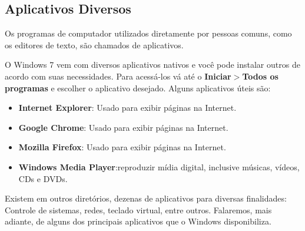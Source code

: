 \documentclass[hidelinks,12pt]{article}
\begin{document}
\subsection{Aplicativos Diversos}

Os programas de computador utilizados diretamente por pessoas comuns, como os editores de texto, são chamados de aplicativos.

O Windows 7 vem com diversos aplicativos nativos e você pode instalar outros de acordo com suas necessidades. Para acessá-los vá até o {\bf Iniciar$>$Todos os programas} e escolher o aplicativo desejado. Alguns aplicativos úteis são:

\begin{itemize}
	\item{
		{\bf Internet Explorer}: Usado para exibir páginas na Internet.
    }



    \item{
    	{\bf Google Chrome}: Usado para exibir páginas na Internet.
    	}

	\item{
		{\bf Mozilla Firefox}: Usado para exibir páginas na Internet.
		}


	\item{
		{\bf Windows Media Player}:reproduzir mídia digital, inclusive músicas, vídeos, CDs e DVDs.
		}

\end{itemize}

Existem em outros diretórios, dezenas de aplicativos para diversas finalidades: Controle de sistemas, redes, teclado virtual, entre outros. Falaremos, mais adiante, de alguns dos principais aplicativos que o Windows disponibiliza.
\end{document}
